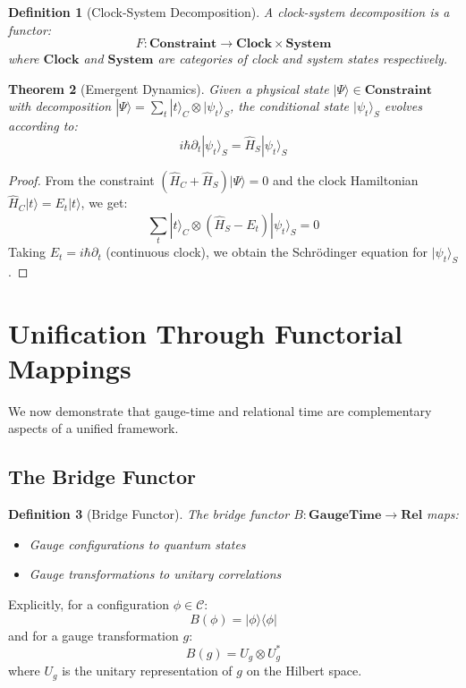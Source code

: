 \documentclass[12pt,a4paper]{article}
\newtheorem{theorem}{Theorem}[section]
\newtheorem{definition}[theorem]{Definition}
\newcommand{\Config}{\mathcal{C}}
\begin{document}
\begin{definition}[Clock-System Decomposition]
A clock-system decomposition is a functor:
\[
F: \mathbf{Constraint} \to \mathbf{Clock} \times \mathbf{System}
\]
where $\mathbf{Clock}$ and $\mathbf{System}$ are categories of clock and system states respectively.
\end{definition}

\begin{theorem}[Emergent Dynamics]
Given a physical state $|\Psi\rangle \in \mathbf{Constraint}$ with decomposition $|\Psi\rangle = \sum_t |t\rangle_C \otimes |\psi_t\rangle_S$, the conditional state $|\psi_t\rangle_S$ evolves according to:
\[
i\hbar\partial_t|\psi_t\rangle_S = \hat{H}_S|\psi_t\rangle_S
\]
\end{theorem}

\begin{proof}
From the constraint $(\hat{H}_C + \hat{H}_S)|\Psi\rangle = 0$ and the clock Hamiltonian $\hat{H}_C|t\rangle = E_t|t\rangle$, we get:
\[
\sum_t |t\rangle_C \otimes (\hat{H}_S - E_t)|\psi_t\rangle_S = 0
\]
Taking $E_t = i\hbar\partial_t$ (continuous clock), we obtain the Schrödinger equation for $|\psi_t\rangle_S$.
\end{proof}

\section{Unification Through Functorial Mappings}

We now demonstrate that gauge-time and relational time are complementary aspects of a unified framework.

\subsection{The Bridge Functor}

\begin{definition}[Bridge Functor]
The bridge functor $B: \mathbf{GaugeTime} \to \mathbf{Rel}$ maps:
\begin{itemize}
\item Gauge configurations to quantum states
\item Gauge transformations to unitary correlations
\end{itemize}
\end{definition}

Explicitly, for a configuration $\phi \in \Config$:
\[
B(\phi) = |\phi\rangle\langle\phi|
\]
and for a gauge transformation $g$:
\[
B(g) = U_g \otimes U_g^*
\]
where $U_g$ is the unitary representation of $g$ on the Hilbert space.
\end{document}
